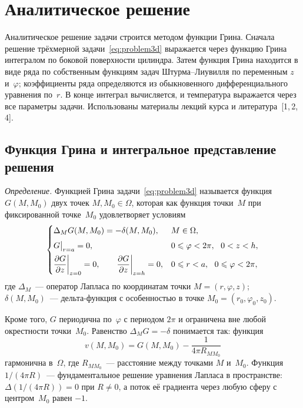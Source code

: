 \chapter{Аналитическое решение}
\label{ch:analytic}

Аналитическое решение задачи строится методом функции Грина. Сначала
решение трёхмерной задачи~\eqref{eq:problem3d} выражается через функцию
Грина интегралом по боковой поверхности цилиндра. Затем функция Грина
находится в виде ряда по собственным функциям задач Штурма--Лиувилля по
переменным $z$ и~$\varphi$; коэффициенты ряда определяются из
обыкновенного дифференциального уравнения по~$r$. В конце интеграл
вычисляется, и температура выражается через все параметры задачи.
Использованы материалы лекций курса и литература~[1,\,2,\,4].

\section{Функция Грина и интегральное представление решения}
\label{sec:green-def}

\emph{Определение.} Функцией Грина задачи~\eqref{eq:problem3d} называется
функция $G(M,M_0)$ двух точек $M,M_0\in\Omega$, которая как функция
точки~$M$ при фиксированной точке~$M_0$ удовлетворяет условиям
\begin{equation}
\label{eq:G-def}
\begin{cases}
\Delta_M G(M,M_0)=-\delta(M,M_0),
  & M\in\Omega,\\[4pt]
G\big|_{r=a}=0,
  & 0\le\varphi<2\pi,\ \ 0<z<h,\\[4pt]
\pd{G}{z}\bigg|_{z=0}=0,\qquad \pd{G}{z}\bigg|_{z=h}=0,
  & 0\le r<a,\ \ 0\le\varphi<2\pi,
\end{cases}
\postdisplaypenalty=10000
\end{equation}
где $\Delta_M$~— оператор Лапласа по координатам точки $M=(r,\varphi,z)$;\\
\hphantom{где }$\delta(M,M_0)$~— дельта-функция с особенностью в точке
$M_0=(r_0,\varphi_0,z_0)$.

Кроме того, $G$ периодична по~$\varphi$ с периодом $2\pi$ и ограничена
вне любой окрестности точки~$M_0$. Равенство $\Delta_M G=-\delta$
понимается так: функция
\begin{equation}
\label{eq:G-sing}
v(M,M_0)=G(M,M_0)-\frac{1}{4\pi R_{MM_0}}
\end{equation}
гармонична в~$\Omega$, где $R_{MM_0}$~— расстояние между точками $M$
и~$M_0$. Функция $1/(4\pi R)$~— фундаментальное решение уравнения
Лапласа в пространстве: $\Delta(1/(4\pi R))=0$ при $R\ne0$, а поток её
градиента через любую сферу с центром~$M_0$ равен $-1$.

